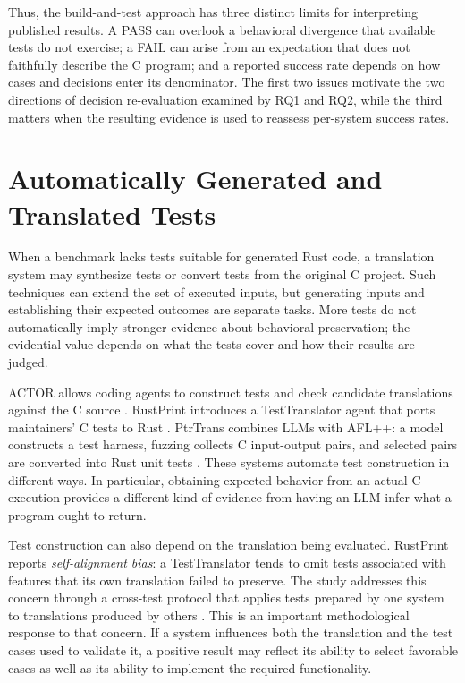 Thus, the build-and-test approach has three distinct limits for
interpreting published results. A PASS can overlook a behavioral
divergence that available tests do not exercise; a FAIL can arise from
an expectation that does not faithfully describe the C program; and a
reported success rate depends on how cases and decisions enter its
denominator. The first two issues motivate the two directions of
decision re-evaluation examined by RQ1 and RQ2, while the third matters
when the resulting evidence is used to reassess per-system success
rates.

\section{Automatically Generated and Translated Tests}
\label{sec:rw-generated-tests}

When a benchmark lacks tests suitable for generated Rust code, a
translation system may synthesize tests or convert tests from the
original C project. Such techniques can extend the set of executed
inputs, but generating inputs and establishing their expected outcomes
are separate tasks. More tests do not automatically imply stronger
evidence about behavioral preservation; the evidential value depends on
what the tests cover and how their results are judged.

ACTOR allows coding agents to construct tests and check candidate
translations against the C source \cite{schesch2026actor}. RustPrint
introduces a TestTranslator agent that ports maintainers' C tests to
Rust \cite{leanh2026rustprint}. PtrTrans combines LLMs with AFL++: a
model constructs a test harness, fuzzing collects C input-output pairs,
and selected pairs are converted into Rust unit tests
\cite{yuan2026ptrtrans}. These systems automate test construction in
different ways. In particular, obtaining expected behavior from an
actual C execution provides a different kind of evidence from having an
LLM infer what a program ought to return.

Test construction can also depend on the translation being evaluated.
RustPrint reports \emph{self-alignment bias}: a TestTranslator tends to
omit tests associated with features that its own translation failed to
preserve. The study addresses this concern through a cross-test protocol
that applies tests prepared by one system to translations produced by
others \cite{leanh2026rustprint}. This is an important methodological response to that concern. If a
system influences both the translation and the test cases used to
validate it, a positive result may reflect its ability to select
favorable cases as well as its ability to implement the required
functionality.

